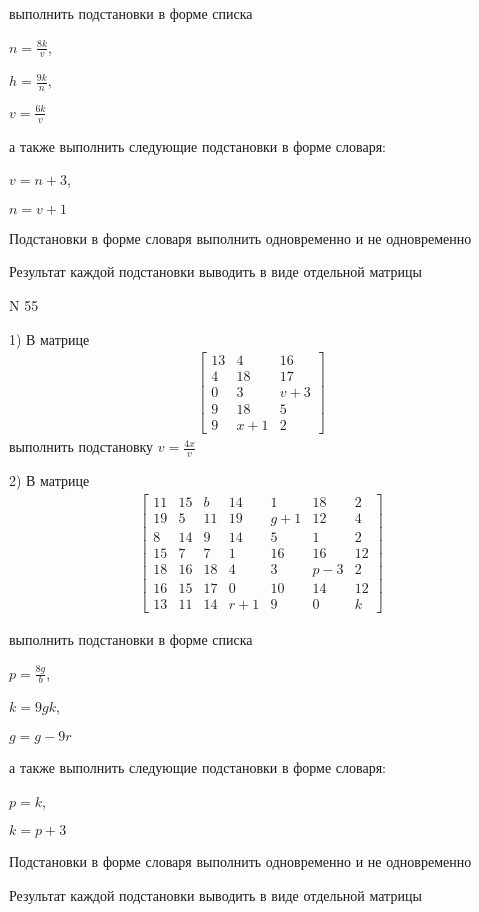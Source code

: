 \documentclass[11pt]{report}
\begin{document}
выполнить подстановки в форме списка

$n=\frac{8 k}{v}$,

$h=\frac{9 k}{n}$,

$v=\frac{6 k}{v}$

а также выполнить следующие подстановки в форме словаря:

$v=n + 3$,

$n=v + 1$


    Подстановки в форме словаря выполнить одновременно и не одновременно


    Результат каждой подстановки выводить в виде отдельной матрицы

\newpage
N 55


    1) В матрице
\begin{align*}
\left[\begin{matrix}13 & 4 & 16\\4 & 18 & 17\\0 & 3 & v + 3\\9 & 18 & 5\\9 & x + 1 & 2\end{matrix}\right]
\end{align*}
выполнить подстановку $v=\frac{4 x}{v}$


    2) В матрице
\begin{align*}
\left[\begin{matrix}11 & 15 & b & 14 & 1 & 18 & 2\\19 & 5 & 11 & 19 & g + 1 & 12 & 4\\8 & 14 & 9 & 14 & 5 & 1 & 2\\15 & 7 & 7 & 1 & 16 & 16 & 12\\18 & 16 & 18 & 4 & 3 & p - 3 & 2\\16 & 15 & 17 & 0 & 10 & 14 & 12\\13 & 11 & 14 & r + 1 & 9 & 0 & k\end{matrix}\right]
\end{align*}

выполнить подстановки в форме списка

$p=\frac{8 g}{b}$,

$k=9 g k$,

$g=g - 9 r$

а также выполнить следующие подстановки в форме словаря:

$p=k$,

$k=p + 3$


    Подстановки в форме словаря выполнить одновременно и не одновременно


    Результат каждой подстановки выводить в виде отдельной матрицы
\end{document}
